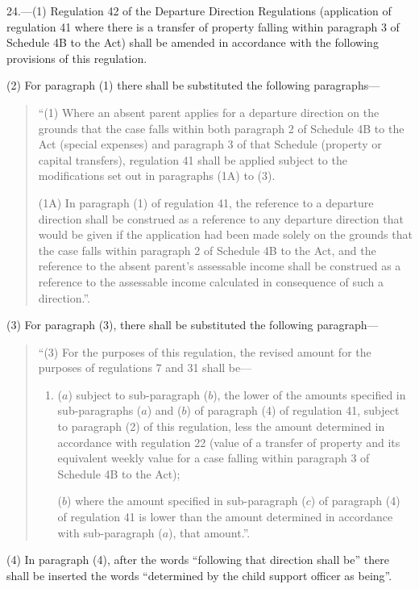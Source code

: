 \documentclass[12pt,a4paper]{article}
\begin{document}
24.—(1) Regulation 42 of the Departure Direction Regulations (application of regulation 41 where there is a transfer of property falling within paragraph 3 of Schedule 4B to the Act) shall be amended in accordance with the following provisions of this regulation.

(2) For paragraph (1) there shall be substituted the following paragraphs—
\begin{quotation}
“(1) Where an absent parent applies for a departure direction on the grounds that the case falls within both paragraph 2 of Schedule 4B to the Act (special expenses) and paragraph 3 of that Schedule (property or capital transfers), regulation 41 shall be applied subject to the modifications set out in paragraphs (1A) to (3).

(1A) In paragraph (1) of regulation 41, the reference to a departure direction shall be construed as a reference to any departure direction that would be given if the application had been made solely on the grounds that the case falls within paragraph 2 of Schedule 4B to the Act, and the reference to the absent parent’s assessable income shall be construed as a reference to the assessable income calculated in consequence of such a direction.”.
\end{quotation}

(3) For paragraph (3), there shall be substituted the following paragraph—
\begin{quotation}
“(3) For the purposes of this regulation, the revised amount for the purposes of regulations 7 and 31 shall be—
\begin{enumerate}\item[]
($a$) subject to sub-paragraph ($b$), the lower of the amounts specified in sub-paragraphs ($a$) and ($b$) of paragraph (4) of regulation 41, subject to paragraph (2) of this regulation, less the amount determined in accordance with regulation 22 (value of a transfer of property and its equivalent weekly value for a case falling within paragraph 3 of Schedule 4B to the Act);

($b$) where the amount specified in sub-paragraph ($c$) of paragraph (4) of regulation 41 is lower than the amount determined in accordance with sub-paragraph ($a$), that amount.”.
\end{enumerate}
\end{quotation}

(4) In paragraph (4), after the words “following that direction shall be” there shall be inserted the words “determined by the child support officer as being”.
\end{document}
